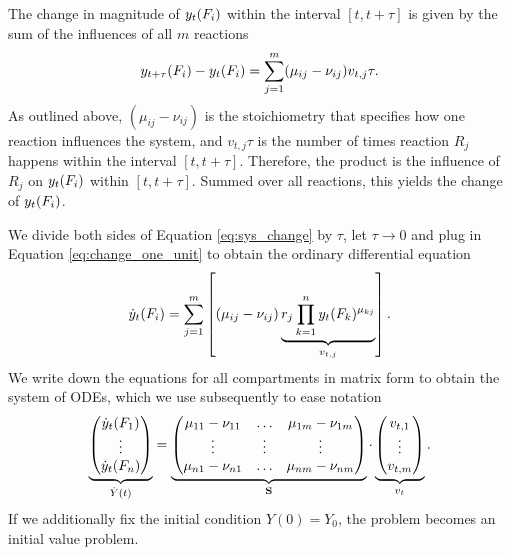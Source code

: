 The change in magnitude of $y_t(F_i)$ within the interval $[t, t+\tau]$ is given by the sum of the influences of all $m$ reactions
\begin{align}
\label{eq:sys_change}
y_{t+\tau}(F_i) - y_t(F_i) = \sum_{j=1}^m (\mu_{ij} - \nu_{ij}) v_{t,j} \tau.
\end{align}
As outlined above, $(\mu_{ij} - \nu_{ij})$ is the stoichiometry that specifies how one reaction influences the system, and $v_{t,j} \tau$ is the number of times reaction $R_j$ happens within the interval $[t, t+\tau]$. Therefore, the product is the influence of $R_j$ on $y_t(F_i)$ within $[t, t+\tau]$. Summed over all reactions, this yields the change of $y_t(F_i)$. 

We divide both sides of Equation \eqref{eq:sys_change} by $\tau$, let $\tau \to 0$ and plug in Equation \eqref{eq:change_one_unit} to obtain the ordinary differential equation
\begin{align}
\dot{y}_t(F_i) = \sum_{j=1}^m \left[(\mu_{ij} - \nu_{ij}) \underbrace{r_j  \prod_{k=1}^n y_t(F_k)^{\mu_{kj}}}_{v_{t,j}} \right].
\end{align}
We write down the equations for all compartments in matrix form to obtain the system of ODEs, which we use subsequently to ease notation
\begin{align}
\label{eq:ode_system_matrix}
\underbrace{\begin{pmatrix}
\dot{y}_t(F_1) \\ \vdots \\ \dot{y}_t(F_n) \end{pmatrix}}_{\dot{Y}(t)} =
\underbrace{\begin{pmatrix}
\mu_{11} - \nu_{11} & \hdots & \mu_{1m} - \nu_{1m} \\
\vdots & \vdots & \vdots \\
\mu_{n1} - \nu_{n1} & \hdots & \mu_{nm} - \nu_{nm} \\
\end{pmatrix}}_{\mathbf{S}} \cdot
\underbrace{\begin{pmatrix}
v_{t,1} \\ \vdots \\ v_{t,m}
\end{pmatrix}}_{v_t}.
\end{align}
If we additionally fix the initial condition $Y(0) = Y_0$, the problem becomes an initial value problem. 

